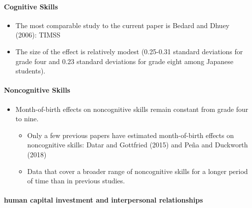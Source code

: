 \documentclass[../root]{subfiles}
\begin{document}
    \paragraph{Cognitive Skills}

    \begin{itemize}
      \item The most comparable study to the current paper is Bedard and Dhuey (2006): TIMSS
      \item The size of the effect is relatively modest (0.25-0.31 standard deviations for grade four and 0.23 standard deviations for grade eight among Japanese students).
    \end{itemize}

    \paragraph{Noncognitive Skills}

    \begin{itemize}
      \item Month-of-birth effects on noncognitive skills remain constant from grade four to nine.
      \begin{itemize}
        \item Only a few previous papers have estimated month-of-birth effects on noncognitive skills: Datar and Gottfried (2015) and Peña and Duckworth (2018)
        \item Data that cover a broader range of noncognitive skills for a longer period of time than in previous studies.
      \end{itemize}
    \end{itemize}

    \paragraph{human capital investment and interpersonal relationships}
\end{document}
